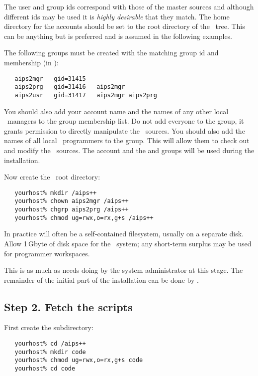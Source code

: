 \noindent
The user and group ids correspond with those of the master sources and
although different ids may be used it is {\em highly desirable} that they
match.  The home directory for the accounts should be set to the root
directory of the \aipspp\ tree.  This can be anything but  is
preferred and is assumed in the following examples.

The following groups must be created with the matching group id and membership
(in ):

\begin{verbatim}
   aips2mgr   gid=31415
   aips2prg   gid=31416   aips2mgr
   aips2usr   gid=31417   aips2mgr aips2prg
\end{verbatim}

\noindent
You should also add your account name and the names of any other local
\aipspp\ managers to the  group membership list.  Do not add
everyone to the  group, it grants permission to directly
manipulate the \rcs\ sources.  You should also add the names of all local
\aipspp\ programmers to the  group.  This will allow them to
check out and modify the \aipspp\ sources.  The  account and the
 and  groups will be used during the installation.

Now create the \aipspp\ root directory:

\begin{verbatim}
   yourhost% mkdir /aips++
   yourhost% chown aips2mgr /aips++
   yourhost% chgrp aips2prg /aips++
   yourhost% chmod ug=rwx,o=rx,g+s /aips++
\end{verbatim}

\noindent
In practice  will often be a self-contained filesystem, usually
on a separate disk.  Allow 1\,Gbyte of disk space for the \aipspp\ system; any
short-term surplus may be used for programmer workspaces.

This is as much as needs doing by the system administrator at this stage.  The
remainder of the initial part of the installation can be done by
.

\subsection*{Step 2. Fetch the  scripts}

First create the  subdirectory:

\begin{verbatim}
   yourhost% cd /aips++
   yourhost% mkdir code
   yourhost% chmod ug=rwx,o=rx,g+s code
   yourhost% cd code
\end{verbatim}

